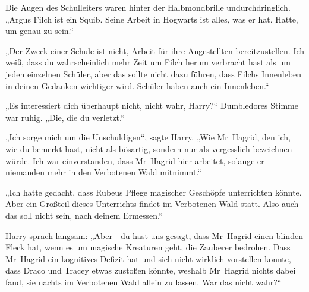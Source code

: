 Die Augen des Schulleiters waren hinter der Halbmondbrille undurchdringlich.
„Argus Filch ist ein Squib. Seine Arbeit in Hogwarts ist alles, was er hat. Hatte, um genau zu sein.“

„Der Zweck einer Schule ist nicht, Arbeit für ihre Angestellten bereitzustellen. Ich weiß, dass du wahrscheinlich mehr Zeit um Filch herum verbracht hast als um jeden einzelnen Schüler, aber das sollte nicht dazu führen, dass Filchs Innenleben in deinen Gedanken wichtiger wird. Schüler haben auch ein Innenleben.“

„Es interessiert dich überhaupt nicht, nicht wahr, Harry?“ Dumbledores Stimme war ruhig. „Die, die du verletzt.“

„Ich sorge mich um die Unschuldigen“, sagte Harry. „Wie Mr~Hagrid, den ich, wie du bemerkt hast, nicht als bösartig, sondern nur als vergesslich bezeichnen würde. Ich war einverstanden, dass Mr~Hagrid hier arbeitet, solange er niemanden mehr in den Verbotenen Wald mitnimmt.“

„Ich hatte gedacht, dass Rubeus Pflege magischer Geschöpfe unterrichten könnte. Aber ein Großteil dieses Unterrichts findet im Verbotenen Wald statt. Also auch das soll nicht sein, nach deinem Ermessen.“

Harry sprach langsam: „Aber—du hast uns gesagt, dass Mr~Hagrid einen blinden Fleck hat, wenn es um magische Kreaturen geht, die Zauberer bedrohen. Dass Mr~Hagrid ein kognitives Defizit hat und sich nicht wirklich vorstellen konnte, dass Draco und Tracey etwas zustoßen könnte, weshalb Mr~Hagrid nichts dabei fand, sie nachts im Verbotenen Wald allein zu lassen. War das nicht wahr?“

